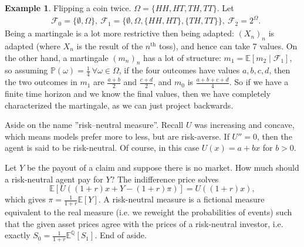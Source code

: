 \documentclass{article}
\theoremstyle{definition}
\newtheorem{example}{Example}[section]
\begin{document}
\begin{example}
    Flipping a coin twice. $\Omega = \{HH,HT,TH,TT\}$. Let 
    \begin{align*}
        &\mathcal{F}_0 = \{\emptyset, \Omega\}, ~\mathcal{F}_1 = \{\emptyset, \Omega, \{HH,HT\}, \{TH,TT\}\},~ \mathcal{F}_2 = 2^{\Omega}.
    \end{align*}
    Being a martingale is a lot more restrictive then being adapted: $(X_n)_n$ is adapted (where $X_n$ is the result of the $n^{\text{th}}$ toss), and hence can take 7 values. On the other hand, a martingale $(m_n)_n$ has a lot of structure: $m_1 = \mathbb{E}[m_2 \mid \mathcal{F}_1]$, so assuming $\mathbb{P}(\omega)=\frac{1}{4} ~\forall \omega \in \Omega$, if the four outcomes have values $a,b,c,d$, then the two outcomes in $m_1$ are $\frac{a+b}{2}$ and $\frac{c+d}{2}$, and $m_0$ is $\frac{a+b+c+d}{4}$. So if we have a finite time horizon and we know the final values, then we have completely characterized the martingale, as we can just project backwards.
\end{example}


Aside on the name ''risk--neutral measure''. Recall $U$ was increasing and concave, which means models prefer more to less, but are risk-averse. If $U''=0$, then the agent is said to be risk-neutral. Of course, in this case $U(x)=a+bx$ for $b>0$.

Let $Y$ be the payout of a claim and suppose there is no market. How much should a risk-neutral agent pay for $Y$? The indifference price solves \[
\mathbb{E}[U((1+r)x+Y-(1+r)\pi)] = U((1+r)x),
\]
which gives $\pi = \frac{1}{1+r}\mathbb{E}[Y]$. A risk-neutral measure is a fictional measure equivalent to the real measure (i.e. we reweight the probabilities of events) such that the given asset prices agree with the prices of a risk-neutral investor, i.e. exactly $S_0 = \frac{1}{1+r}\mathbb{E}^{\mathbb{Q}}[S_1]$. End of aside.
\end{document}
